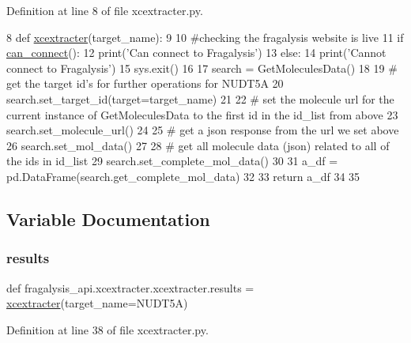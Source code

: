 Definition at line 8 of file xcextracter.\+py.


\begin{DoxyCode}
8 \textcolor{keyword}{def }\hyperlink{namespacefragalysis__api_1_1xcextracter_1_1xcextracter_a9aad6a3badcb479c966f153ce6b87126}{xcextracter}(target\_name):
9 
10     \textcolor{comment}{#checking the fragalysis website is live}
11     \textcolor{keywordflow}{if} \hyperlink{namespacefragalysis__api_1_1xcextracter_1_1frag__web__live_a0c358bb08db16e67b947ea3e06a2516c}{can\_connect}():
12         print(\textcolor{stringliteral}{'Can connect to Fragalysis'})
13     \textcolor{keywordflow}{else}:
14         print(\textcolor{stringliteral}{'Cannot connect to Fragalysis'})
15         sys.exit()
16 
17     search = GetMoleculesData()
18 
19     \textcolor{comment}{# get the target id's for further operations for NUDT5A}
20     search.set\_target\_id(target=target\_name)
21 
22     \textcolor{comment}{# set the molecule url for the current instance of GetMoleculesData to the first id in the id\_list from
       above}
23     search.set\_molecule\_url()
24 
25     \textcolor{comment}{# get a json response from the url we set above}
26     search.set\_mol\_data()
27 
28     \textcolor{comment}{# get all molecule data (json) related to all of the ids in id\_list}
29     search.set\_complete\_mol\_data()
30 
31     a\_df = pd.DataFrame(search.get\_complete\_mol\_data)
32 
33     \textcolor{keywordflow}{return} a\_df
34 
35 
\end{DoxyCode}


\subsection{Variable Documentation}
\mbox{\label{namespacefragalysis__api_1_1xcextracter_1_1xcextracter_a72e0abb30ca031f003e991a2d76b1040}} 
\subsubsection{\texorpdfstring{results}{results}}
{\footnotesize\ttfamily def fragalysis\+\_\+api.\+xcextracter.\+xcextracter.\+results = \hyperlink{namespacefragalysis__api_1_1xcextracter_1_1xcextracter_a9aad6a3badcb479c966f153ce6b87126}{xcextracter}(target\+\_\+name=\textquotesingle{}N\+U\+D\+T5A\textquotesingle{})}



Definition at line 38 of file xcextracter.\+py.

